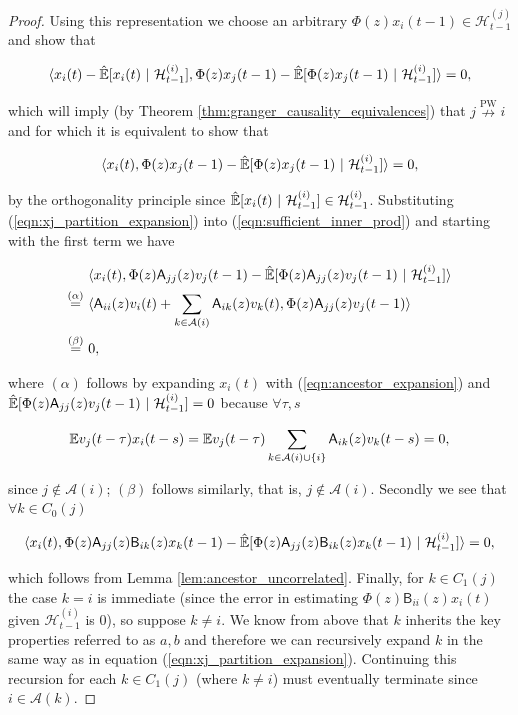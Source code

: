 \documentclass[12pt]{article}
\def\npwgc{\overset{\text{PW}}{\nrightarrow}}  %
\def\B{\mathsf{B}}  %
\def\A{\mathsf{A}}  %
\def\H{\mathcal{H}}  %
\newcommand{\linE}[2]{\hat{\E}[#1\ |\ #2]}  %
\newcommand{\anc}[1]{\mathcal{A}(#1)}  %
\begin{document}
\begin{proof}
  Using this representation we choose an arbitrary $\Phi(z) x_i(t - 1) \in \H_{t - 1}^{(j)}$ and show that

  \begin{equation}
    \inner{x_i(t) - \linE{x_i(t)}{\H_{t - 1}^{(i)}}}{\Phi(z)x_j(t - 1) - \linE{\Phi(z)x_j(t - 1)}{\H_{t - 1}^{(i)}}} = 0,
  \end{equation}

  which will imply (by Theorem \ref{thm:granger_causality_equivalences}) that $j \npwgc i$ and for which it is equivalent to show that

  \begin{equation}
    \label{eqn:sufficient_inner_prod}
    \inner{x_i(t)}{\Phi(z)x_j(t - 1) - \linE{\Phi(z)x_j(t - 1)}{\H_{t - 1}^{(i)}}} = 0,
  \end{equation}

  by the orthogonality principle since $\linE{x_i(t)}{\H_{t - 1}^{(i)}} \in \H_{t - 1}^{(i)}$.  Substituting (\ref{eqn:xj_partition_expansion}) into (\ref{eqn:sufficient_inner_prod}) and starting with the first term we have

  \begin{align*}
    &\inner{x_i(t)}{\Phi(z)\A_{jj}(z)v_j(t - 1) - \linE{\Phi(z)\A_{jj}(z)v_j(t - 1)}{\H_{t - 1}^{(i)}}}\\
    \overset{(\alpha)}{=}\ &\inner{\A_{ii}(z)v_i(t) + \sum_{k \in \anc{i}}\A_{ik}(z)v_k(t)}{\Phi(z)\A_{jj}(z)v_j(t - 1)}\\
    \overset{(\beta)}{=}\ &0,
  \end{align*}

  where $(\alpha)$ follows by expanding $x_i(t)$ with (\ref{eqn:ancestor_expansion}) and $\linE{\Phi(z)\A_{jj}(z)v_j(t - 1)}{\H_{t - 1}^{(i)}} = 0$ because $\forall \tau, s$

  \begin{equation*}
    \E v_j(t - \tau) x_i(t - s) = \E v_j(t - \tau) \sum_{k \in \anc{i} \cup \{i\}}\A_{ik}(z)v_k(t - s) = 0,
  \end{equation*}

  since $j \not \in \anc{i}$; $(\beta)$ follows similarly, that is, $j \not \in \anc{i}$.  Secondly we see that $\forall k \in C_0(j)$

  \begin{equation*}
    \inner{x_i(t)}{\Phi(z)\A_{jj}(z)\B_{ik}(z)x_k(t - 1) - \linE{\Phi(z)\A_{jj}(z)\B_{ik}(z)x_k(t - 1)}{\H_{t - 1}^{(i)}}} = 0,
  \end{equation*}

  which follows from Lemma \ref{lem:ancestor_uncorrelated}.
  Finally, for $k \in C_1(j)$ the case $k = i$ is immediate (since the
  error in estimating $\Phi(z)\B_{ii}(z)x_i(t)$ given
  $\H_{t - 1}^{(i)}$ is $0$), so suppose $k \ne i$.  We know from
  above that $k$ inherits the key properties referred to as $a, b$ and
  therefore we can recursively expand $k$ in the same way as in
  equation (\ref{eqn:xj_partition_expansion}).  Continuing this
  recursion for each $k \in C_1(j)$ (where $k \ne i$) must eventually
  terminate since $i \in \anc{k}$.
\end{proof}
\end{document}

